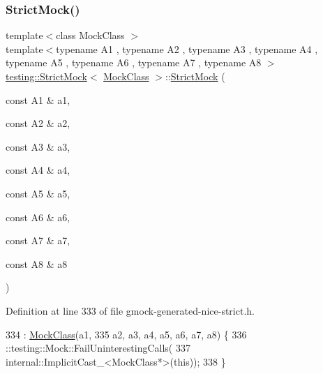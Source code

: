 \subsubsection{\texorpdfstring{Strict\+Mock()}{StrictMock()}\hspace{0.1cm}{\footnotesize\ttfamily [9/11]}}
{\footnotesize\ttfamily template$<$class Mock\+Class $>$ \\
template$<$typename A1 , typename A2 , typename A3 , typename A4 , typename A5 , typename A6 , typename A7 , typename A8 $>$ \\
\hyperlink{classtesting_1_1StrictMock}{testing\+::\+Strict\+Mock}$<$ \hyperlink{classMockClass}{Mock\+Class} $>$\+::\hyperlink{classtesting_1_1StrictMock}{Strict\+Mock} (\begin{DoxyParamCaption}\item[{const A1 \&}]{a1,  }\item[{const A2 \&}]{a2,  }\item[{const A3 \&}]{a3,  }\item[{const A4 \&}]{a4,  }\item[{const A5 \&}]{a5,  }\item[{const A6 \&}]{a6,  }\item[{const A7 \&}]{a7,  }\item[{const A8 \&}]{a8 }\end{DoxyParamCaption})\hspace{0.3cm}{\ttfamily [inline]}}



Definition at line 333 of file gmock-\/generated-\/nice-\/strict.\+h.


\begin{DoxyCode}
334                                                               : \hyperlink{classMockClass}{MockClass}(a1,
335       a2, a3, a4, a5, a6, a7, a8) \{
336     ::testing::Mock::FailUninterestingCalls(
337         internal::ImplicitCast\_<MockClass*>(\textcolor{keyword}{this}));
338   \}
\end{DoxyCode}
\mbox{\label{classtesting_1_1StrictMock_a4129f247ae087d586fdb04f450422d3e}} 
